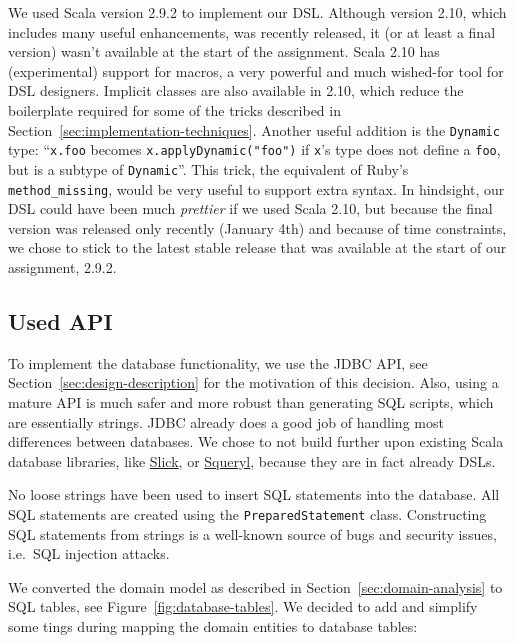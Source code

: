 \documentclass[a4paper]{article}
\newcommand{\cc}[1]{\texttt{#1}}
\renewcommand{\sc}[1]{\lstinline{#1}}
\begin{document}
We used Scala version 2.9.2 to implement our DSL.
Although version 2.10, which includes many useful enhancements, was recently released, it (or at least a final version) wasn't available at the start of the assignment.
Scala 2.10 has (experimental) support for macros, a very powerful and much wished-for tool for DSL designers.
Implicit classes are also available in 2.10, which reduce the boilerplate required for some of the tricks described in Section~\ref{sec:implementation-techniques}.
Another useful addition is the \cc{Dynamic} type: ``\sc{x.foo} becomes \sc{x.applyDynamic("foo")} if \sc{x}'s type does not define a \sc{foo}, but is a subtype of \cc{Dynamic}''.
This trick, the equivalent of Ruby's \cc{method\_missing}, would be very useful to support extra syntax.
In hindsight, our DSL could have been much \emph{prettier} if we used Scala 2.10, but because the final version was released only recently (January 4th) and because of time constraints, we chose to stick to the latest stable release that was available at the start of our assignment, 2.9.2.


\subsection{Used API}
\label{sec:used-api}

To implement the database functionality, we use the JDBC API, see Section~\ref{sec:design-description} for the motivation of this decision.
Also, using a mature API is much safer and more robust than generating SQL scripts, which are essentially strings.
JDBC already does a good job of handling most differences between databases.
We chose to not build further upon existing Scala database libraries, like \href{http://slick.typesafe.com/}{Slick}, or \href{http://squeryl.org/}{Squeryl}, because they are in fact already DSLs.

No loose strings have been used to insert SQL statements into the database.
All SQL statements are created using the \cc{Prepared\-Statement} class.
Constructing SQL statements from strings is a well-known source of bugs and security issues, i.e.\ SQL injection attacks.

We converted the domain model as described in Section~\ref{sec:domain-analysis} to SQL tables, see Figure~\ref{fig:database-tables}.
We decided to add and simplify some tings during mapping the domain entities to database tables:
\end{document}

